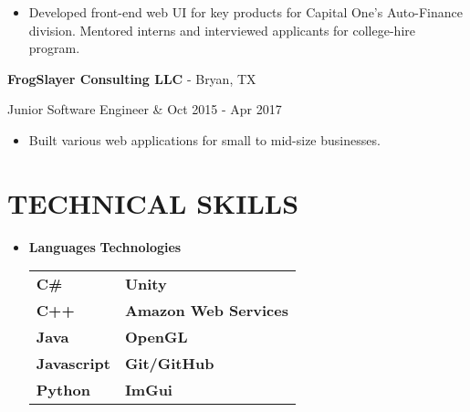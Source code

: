 \documentclass[resmargin,10pt]{res} %
\begin{document}
\begin{resume}
\begin{ncolumn}{2}
                \end{ncolumn}
                \begin{itemize}           
                \item Developed front-end web UI for key products for Capital One's Auto-Finance\\ division. Mentored interns and interviewed applicants for college-hire program.
                \end{itemize}
				{\bf FrogSlayer Consulting LLC} - Bryan, TX \\ 
                \begin{ncolumn}{2} %
                Junior Software Engineer &  \hfill Oct 2015 - Apr 2017
                \end{ncolumn}
                \begin{itemize}           
                \item  Built various web applications for small to mid-size businesses.
                \end{itemize}
                    
\section{TECHNICAL SKILLS}	
							\begin{itemize}
                    		\item[] 
\textbf{\large Languages}  \hspace*{.5in} \textbf{\large Technologies}        \\
\begin{tabular}{ll}
\textbf{C\#} \hspace*{1in}  & \textbf{Unity} \\
\textbf{C++} & \textbf{Amazon Web Services} \\
\textbf{Java}   & \textbf{OpenGL}       \\
\textbf{Javascript}  & \textbf{Git/GitHub}               \\
\textbf{Python} & \textbf{ImGui}               \\
\end{tabular}
                    		\end{itemize} 

\end{resume}
\end{document}
